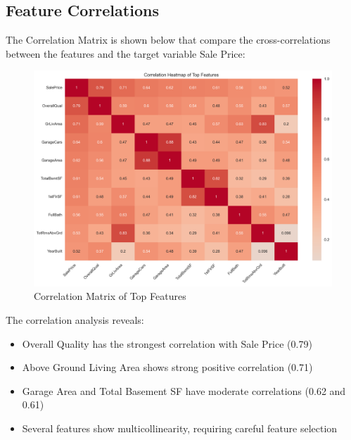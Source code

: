 \subsection{Feature Correlations}
The Correlation Matrix is shown below that compare the cross-correlations between the features and the target variable Sale Price:
\begin{figure}[H]
    \centering
    \includegraphics[width=1.0\textwidth]{figures/correlation_matrix.png}
    \caption{Correlation Matrix of Top Features}
    \label{fig:correlation_matrix}
\end{figure}

The correlation analysis reveals:
\begin{itemize}
    \item Overall Quality has the strongest correlation with Sale Price (0.79)
    \item Above Ground Living Area shows strong positive correlation (0.71)
    \item Garage Area and Total Basement SF have moderate correlations (0.62 and 0.61)
    \item Several features show multicollinearity, requiring careful feature selection
\end{itemize}

